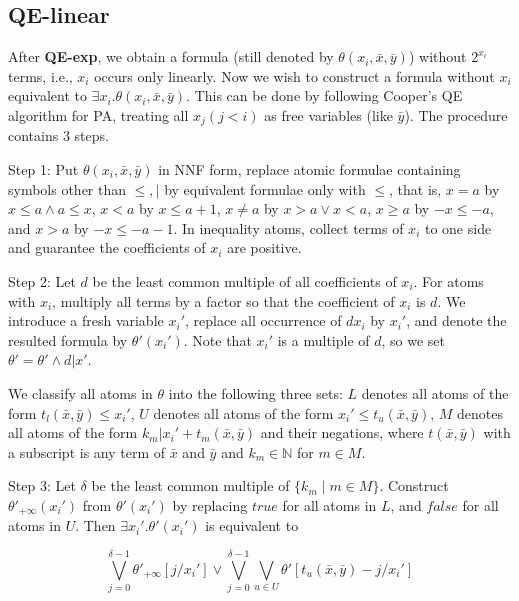 \documentclass[runningheads]{llncs}
\newcommand\znj[1]{\textcolor{red}{#1}}
\begin{document}

\subsection{QE-linear}

After \textbf{QE-exp}, 
we obtain a formula (still denoted by $\theta(x_i,\bar{x},\bar{y})$) without $2^{x_i}$ terms,
i.e., $x_i$ occurs only linearly.
Now we wish to construct a formula without $x_i$ equivalent to $\exists x_i.\theta(x_i,\bar{x},\bar{y})$.
This can be done by 
following Cooper's QE algorithm for PA,
treating all $x_j (j<i)$ as free variables (like $\bar{y}$).
The procedure contains 3 steps.

Step 1: Put $\theta(x_i,\bar{x},\bar{y})$ in NNF form, replace atomic formulae containing symbols other than $\le,|$ by equivalent formulae only with $\le$, that is, $x=a$ by $x\le a \wedge a\le x$, $x< a$ by $x\le a+1$, $x\neq a$ by $x>a \vee x<a$,  $x\geq a$ by $-x \le -a$, and $x>a$ by $-x \le -a-1$.
In inequality atoms, collect terms of $x_i$
to one side and guarantee the coefficients of $x_i$ are positive.

Step 2: Let $d$ be the least common multiple of all coefficients of $x_i$. 
For atoms with $x_i$, multiply all terms by a factor so that the coefficient of $x_i$ is $d$.
We introduce a fresh variable $x_i'$, replace all occurrence of $dx_i$ by $x_i'$,
and denote the resulted formula by $\theta'(x_i')$.
Note that $x_i'$ is a multiple of $d$, 
so we set $\theta'=\theta'\wedge d|x'$.

We classify all atoms in $\theta$ into the following three sets:  
$L$ denotes all atoms of the form $t_l(\bar{x},\bar{y})\le x_i'$,
$U$ denotes all atoms of the form $x_i'\le t_u(\bar{x},\bar{y})$,
$M$ denotes all atoms of the form $k_m|x_i'+t_m(\bar{x},\bar{y})$ and their negations,
where $t(\bar{x},\bar{y})$ with a subscript is any term of $\bar{x}$ and $\bar{y}$ and 
$k_m \in \mathbb{N}$ for $m\in M$. %

Step 3: Let $\delta$ be the least common multiple of $\{k_m \mid m\in M\}$.
Construct $\theta'_{+\infty}(x_i')$ from $\theta'(x_i')$ by  
 replacing $\textit{true}$ for all atoms in $L$,
and $\textit{false}$ for all atoms in  $U$.
Then $\exists x_i'.\theta'(x_i')$
is equivalent to

$$\bigvee_{j=0}^{\delta-1} \theta'_{+\infty}[j/x_i'] \vee 
\bigvee_{j=0}^{\delta-1} \bigvee_{u\in U} \theta'[t_u(\bar{x},\bar{y})-j/x_i']$$
\end{document}
